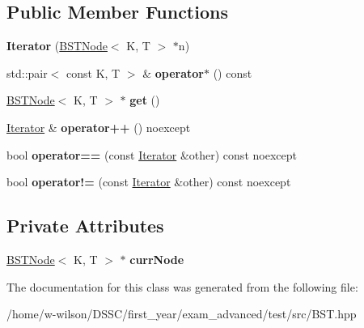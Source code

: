 \subsection*{Public Member Functions}
\begin{DoxyCompactItemize}
\item 
\mbox{\label{class_b_s_tree_1_1_iterator_a1b096b8272584f4f4a6671f36b4b2ad3}} 
{\bfseries Iterator} (\hyperlink{class_node_namespace_1_1_b_s_t_node}{B\+S\+T\+Node}$<$ K, T $>$ $\ast$n)
\item 
\mbox{\label{class_b_s_tree_1_1_iterator_a359cc7e1b08ebc3754d66c2ba21c9e48}} 
std\+::pair$<$ const K, T $>$ \& {\bfseries operator$\ast$} () const
\item 
\mbox{\label{class_b_s_tree_1_1_iterator_a475c05bcbc2976527931db1376d4207f}} 
\hyperlink{class_node_namespace_1_1_b_s_t_node}{B\+S\+T\+Node}$<$ K, T $>$ $\ast$ {\bfseries get} ()
\item 
\mbox{\label{class_b_s_tree_1_1_iterator_af87e8535c50fc23d7b93ab00e0bba05f}} 
\hyperlink{class_b_s_tree_1_1_iterator}{Iterator} \& {\bfseries operator++} () noexcept
\item 
\mbox{\label{class_b_s_tree_1_1_iterator_a88df7eda51af41230c5815a7fb137d1b}} 
bool {\bfseries operator==} (const \hyperlink{class_b_s_tree_1_1_iterator}{Iterator} \&other) const noexcept
\item 
\mbox{\label{class_b_s_tree_1_1_iterator_ae251c8b6329818c54b3a2094c3501d11}} 
bool {\bfseries operator!=} (const \hyperlink{class_b_s_tree_1_1_iterator}{Iterator} \&other) const noexcept
\end{DoxyCompactItemize}
\subsection*{Private Attributes}
\begin{DoxyCompactItemize}
\item 
\mbox{\label{class_b_s_tree_1_1_iterator_aaefde20b1b6b7e8d984c63f909852821}} 
\hyperlink{class_node_namespace_1_1_b_s_t_node}{B\+S\+T\+Node}$<$ K, T $>$ $\ast$ {\bfseries curr\+Node}
\end{DoxyCompactItemize}


The documentation for this class was generated from the following file\+:\begin{DoxyCompactItemize}
\item 
/home/w-\/wilson/\+D\+S\+S\+C/first\+\_\+year/exam\+\_\+advanced/test/src/B\+S\+T.\+hpp\end{DoxyCompactItemize}

